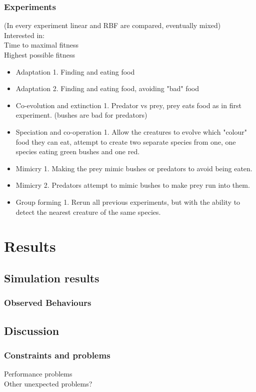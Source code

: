 \documentclass[a4paper,11pt]{kth-mag}
\begin{document}
\subsection{Experiments}
(In every experiment linear and RBF are compared, eventually mixed)\\
Interested in:\\
Time to maximal fitness\\
Highest possible fitness\\
\begin{itemize}
\item Adaptation 1. Finding and eating food
\item Adaptation 2. Finding and eating food, avoiding "bad" food
\item Co-evolution and extinction 1. Predator vs prey, prey eats food as in first experiment. (bushes are bad for predators)
\item Speciation and co-operation 1. Allow the creatures to evolve which "colour" food they can eat, attempt to create two separate species from one, one species eating green bushes and one red.
\item Mimicry 1. Making the prey mimic bushes or predators to avoid being eaten.
\item Mimicry 2. Predators attempt to mimic bushes to make prey run into them.
\item Group forming 1. Rerun all previous experiments, but with the ability to detect the nearest creature of the same species.
\end{itemize}


\chapter{Results}
\section{Simulation results}
\subsection{Observed Behaviours}
\section{Discussion}
\subsection{Constraints and problems}
Performance problems\\
Other unexpected problems?\\
\end{document}
